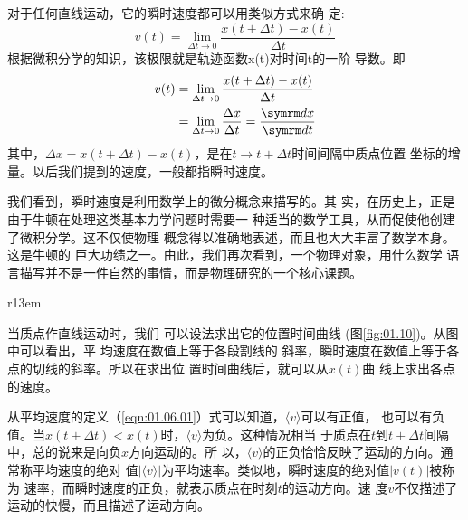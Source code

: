 对于任何直线运动，它的瞬时速度都可以用类似方式来确
定:
\begin{equation*}
        v(t)=\lim _{\Delta t \rightarrow 0} \frac{x(t+\Delta t)-x(t)}{\Delta t}
\end{equation*}
根据微积分学的知识，该极限就是轨迹函数x(t)对时间t的一阶
导数。即
\begin{equation}
    \begin{aligned}
        v(t) & =\lim _{\Delta t \rightarrow 0} \frac{x(t+\Delta t)-x(t)}{\Delta t}                            \\
             & =\lim _{\Delta t \rightarrow 0} \frac{\Delta x}{\Delta t}=\frac{\dif x}{\dif t} \label{eqn:01.06.03}
    \end{aligned}
\end{equation}
其中，$\Delta x=x(t+\Delta t)-x(t)$，是在$t\rightarrow t+\Delta t$时间间隔中质点位置
坐标的增量。以后我们提到的速度，一般都指瞬时速度。

我们看到，瞬时速度是利用数学上的微分概念来描写的。其
实，在历史上，正是由于牛顿在处理这类基本力学问题时需要一
种适当的数学工具，从而促使他创建了微积分学。这不仅使物理
概念得以准确地表述，而且也大大丰富了数学本身。这是牛顿的
巨大功绩之一。由此，我们再次看到，一个物理对象，用什么数学
语言描写并不是一件自然的事情，而是物理研究的一个核心课题。

\begin{wrapfigure}[10]{r}{13em}
    \small \vspace{-1.2em}
    \centering
    \caption{直线运动的$x-t$图}
    \label{fig:01.10}
\end{wrapfigure}
当质点作直线运动时，我们
可以设法求出它的位置时间曲线
(图\ref{fig:01.10})。从图中可以看出，平
均速度在数值上等于各段割线的
斜率，瞬时速度在数值上等于各
点的切线的斜率。所以在求出位
置时间曲线后，就可以从$x(t)$曲
线上求出各点的速度。

从平均速度的定义（\ref{eqn:01.06.01}）式可以知道，$\langle v\rangle$可以有正值，
也可以有负值。当$x(t+\Delta t)<x(t)$时，$\langle v\rangle$为负。这种情况相当
于质点在$t$到$t+\Delta t$间隔中，总的说来是向负$x$方向运动的。所
以，$\langle v\rangle$的正负恰恰反映了运动的方向。通常称平均速度的绝对
值$|\langle v\rangle|$为平均速率。类似地，瞬时速度的绝对值$|v(t)|$被称为
速率，而瞬时速度的正负，就表示质点在时刻$t$的运动方向。速
度$v$不仅描述了运动的快慢，而且描述了运动方向。